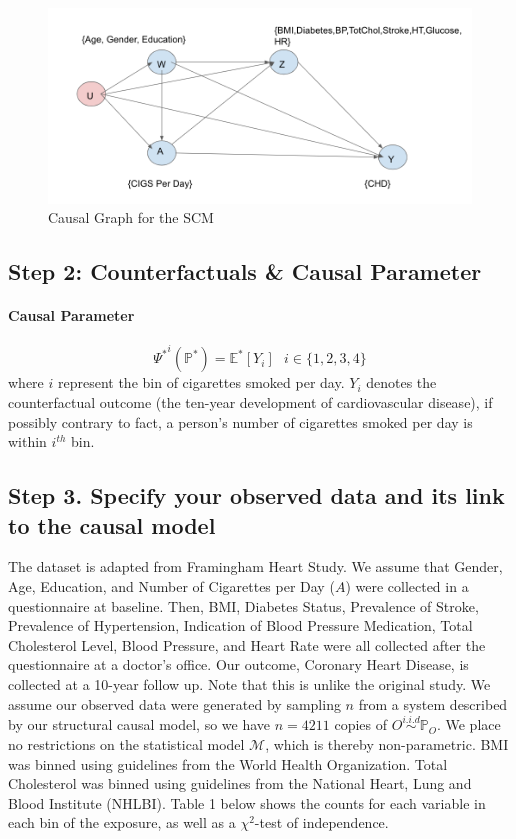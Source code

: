 \documentclass[]{article}
\let\oldparagraph\paragraph
\renewcommand{\paragraph}[1]{\oldparagraph{#1}\mbox{}}
\begin{document}
\begin{figure}

{\centering \includegraphics[width=0.5\linewidth]{./dags/dag_causal} 

}

\caption{Causal Graph for the SCM}\label{fig:fig1}
\end{figure}

\subsection{Step 2: Counterfactuals \& Causal
Parameter}\label{step-2-counterfactuals-causal-parameter}

\paragraph{Causal Parameter}\label{causal-parameter}

\[{\Psi^*}^{i}(\mathbb{P}^*)=\mathbb{E}^*[Y_i]\ \ \ i\in \{1,2,3,4\}\]
where \(i\) represent the bin of cigarettes smoked per day. \(Y_i\)
denotes the counterfactual outcome (the ten-year development of
cardiovascular disease), if possibly contrary to fact, a person's number
of cigarettes smoked per day is within \(i^{th}\) bin.

\subsection{Step 3. Specify your observed data and its link to the
causal
model}\label{step-3.-specify-your-observed-data-and-its-link-to-the-causal-model}

The dataset is adapted from Framingham Heart Study. We assume that
Gender, Age, Education, and Number of Cigarettes per Day (\(A\)) were
collected in a questionnaire at baseline. Then, BMI, Diabetes Status,
Prevalence of Stroke, Prevalence of Hypertension, Indication of Blood
Pressure Medication, Total Cholesterol Level, Blood Pressure, and Heart
Rate were all collected after the questionnaire at a doctor's office.
Our outcome, Coronary Heart Disease, is collected at a 10-year follow
up. Note that this is unlike the original study. We assume our observed
data were generated by sampling \(n\) from a system described by our
structural causal model, so we have \(n = 4211\) copies of
\(O\overset{i.i.d}\sim \mathbb{P}_O\). We place no restrictions on the
statistical model \(\mathcal{M}\), which is thereby non-parametric. BMI
was binned using guidelines from the World Health Organization. Total
Cholesterol was binned using guidelines from the National Heart, Lung
and Blood Institute (NHLBI). Table 1 below shows the counts for each
variable in each bin of the exposure, as well as a \(\chi^2\)-test of
independence.
\end{document}

